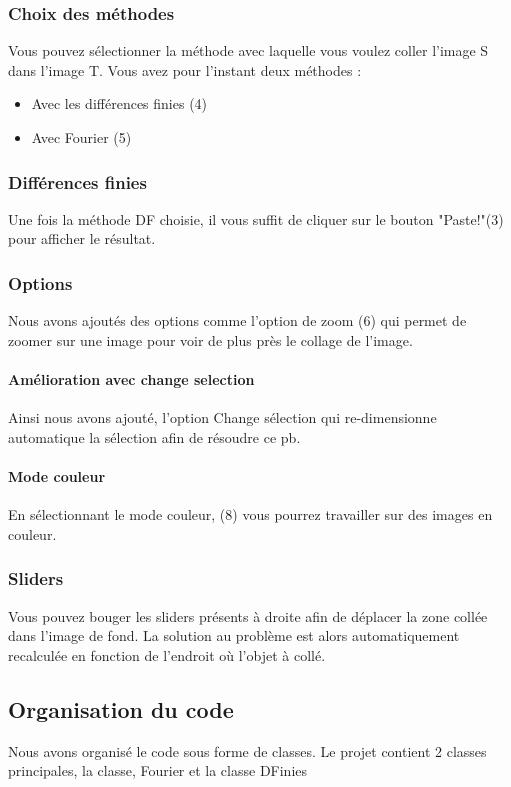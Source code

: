 \subsubsection{Choix des méthodes}
Vous pouvez sélectionner la méthode avec laquelle vous voulez coller l'image S dans l'image T. Vous avez pour l'instant deux méthodes : 
\begin{itemize}
    \item Avec les différences finies (4)
    \item Avec Fourier (5)
\end{itemize}{}

\subsubsection{Différences finies}
Une fois la méthode DF choisie, il vous suffit de cliquer sur le bouton "Paste!"(3)  pour afficher le résultat.
\subsubsection{Options}
Nous avons ajoutés des options comme l'option de zoom (6) qui permet de zoomer sur une image pour voir de plus près le collage de l'image. 
\paragraph{ Amélioration avec change selection}
Ainsi nous avons ajouté, l'option Change sélection qui re-dimensionne automatique la sélection afin de résoudre ce pb. 
\paragraph{Mode couleur}
En sélectionnant le mode couleur, (8) vous pourrez travailler sur des images en couleur. 

\subsubsection{Sliders}
Vous pouvez bouger les sliders présents à droite afin de déplacer la zone collée dans l'image de fond. La solution au problème est alors automatiquement recalculée en fonction de l'endroit où l'objet à collé. 

\subsection{Organisation du code}
Nous avons organisé le code sous forme de classes. Le projet contient 2 classes principales, la classe, Fourier et la classe DFinies

